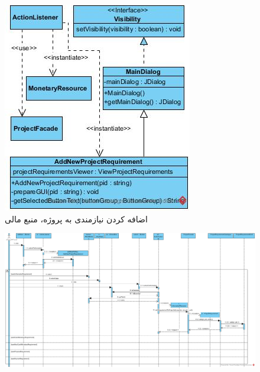 \begin{landscape}
\begin{figure}[H]
	\includegraphics[scale=0.4]{img/sequence-design/AddRequirementToProject_MONETARYUI}
	\caption{اضافه کردن نیازمندی به پروژه، منبع مالی}
\end{figure}
\begin{figure}[H]
	\centering
	\includegraphics[scale=0.5]{img/sequence-design/AddRequirementToProject_INFORMATION}
\end{figure}
\begin{figure}[H]
	\centering

\end{figure}
\end{landscape}
